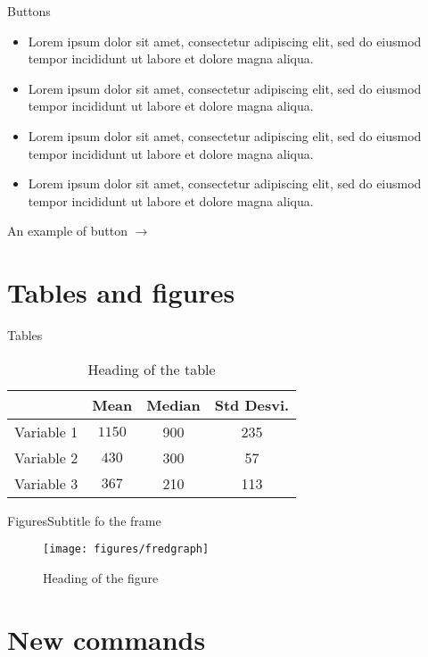 \documentclass[10pt,numbering,toc]{bpslides}
\begin{document}
\begin{frame}{Buttons}
    \vfill
	\begin{itemize}
	\item Lorem ipsum dolor sit amet, consectetur adipiscing elit, sed do eiusmod tempor incididunt ut labore et dolore magna aliqua.
	\item Lorem ipsum dolor sit amet, consectetur adipiscing elit, sed do eiusmod tempor incididunt ut labore et dolore magna aliqua.
	\item Lorem ipsum dolor sit amet, consectetur adipiscing elit, sed do eiusmod tempor incididunt ut labore et dolore magna aliqua.
	\item Lorem ipsum dolor sit amet, consectetur adipiscing elit, sed do eiusmod tempor incididunt ut labore et dolore magna aliqua.
	\end{itemize}
	\vfill
	\hfill An example of button $\to$ 
\end{frame}

\section{Tables and figures}

\begin{frame}{Tables}
    \begin{table}
    \centering
    \caption{Heading of the table}
    \begin{tabular}{cccc} \toprule
        & Mean & Median & Std Desvi.\\ \midrule
        Variable 1 & $1150$ & 900 & 235 \\ 
        Variable 2 & $430$ & 300 & 57 \\ 
        Variable 3 & $367$ & 210 & 113 \\ \bottomrule
    \end{tabular}
    \end{table}
\end{frame}

\begin{frame}{Figures}{Subtitle fo the frame}
    \begin{figure}
    \centering
    \caption{Heading of the figure}
    \texttt{[image: figures/fredgraph]}
    \end{figure}
\end{frame}

\section{New commands}
\end{document}
